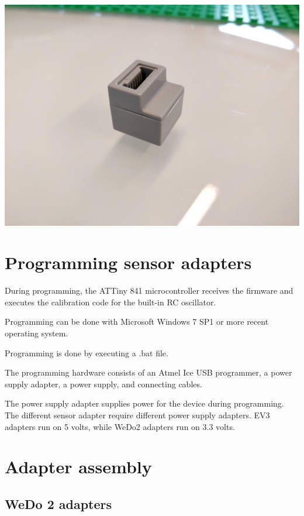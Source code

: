 \documentclass[a4paper,12pt]{article}
\begin{document}
\includegraphics[width=13.5cm]{wedo2-motor-adapter.jpg}

\section{Programming sensor adapters}

During programming, the ATTiny 841 microcontroller receives the firmware and
executes the calibration code for the built-in RC oscillator.

Programming can be done with Microsoft Windows 7 SP1 or more recent operating
system.

Programming is done by executing a .bat file.

The programming hardware consists of an Atmel Ice USB programmer, a power
supply adapter, a power supply, and connecting cables.

The power supply adapter supplies power for the device during programming.
The different sensor adapter require different power supply adapters. EV3
adapters run on 5 volts, while WeDo2 adapters run on 3.3 volts.

\section{Adapter assembly}

\subsection{WeDo 2 adapters}
\end{document}
